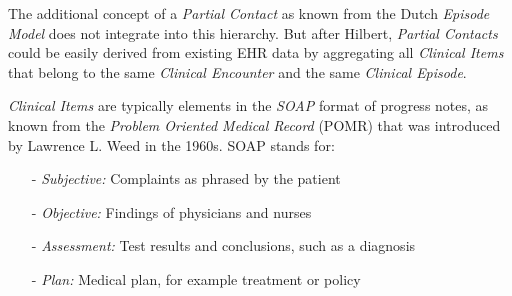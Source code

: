 The additional concept of a \emph{Partial Contact} as known from the Dutch
\emph{Episode Model} does not integrate into this hierarchy. But after Hilbert,
\emph{Partial Contacts} could be easily derived from existing EHR data by
aggregating all \emph{Clinical Items} that belong to the same
\emph{Clinical Encounter} and the same \emph{Clinical Episode}.

\emph{Clinical Items} are typically elements in the \emph{SOAP} format of
progress notes, as known from the \emph{Problem Oriented Medical Record} (POMR)
\cite{weed} that was introduced by Lawrence L. Weed in the 1960s. SOAP stands
for:

\begin{itemize}
    \item[-] \emph{Subjective:} Complaints as phrased by the patient
    \item[-] \emph{Objective:} Findings of physicians and nurses
    \item[-] \emph{Assessment:} Test results and conclusions, such as a diagnosis
    \item[-] \emph{Plan:} Medical plan, for example treatment or policy
\end{itemize}
